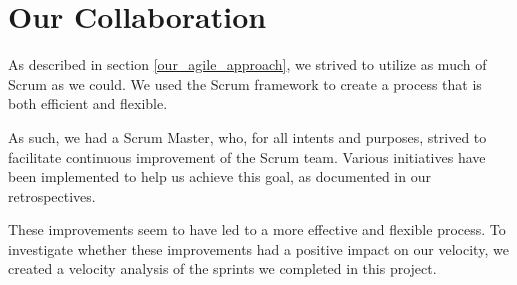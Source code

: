 \section{Our Collaboration}
As described in section \ref{our_agile_approach}, we strived to utilize as much of Scrum as we could. We used the Scrum framework to create a process that is both efficient and flexible. 

As such, we had a Scrum Master, who, for all intents and purposes, strived to facilitate continuous improvement of the Scrum team. Various initiatives have been implemented to help us achieve this goal, as documented in our retrospectives.

These improvements seem to have led to a more effective and flexible process. To investigate whether these improvements had a positive impact on our velocity, we created a velocity analysis of the sprints we completed in this project.

